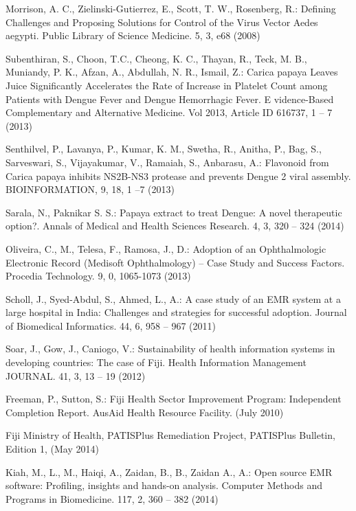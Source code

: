 \documentclass[runningheads,a4paper]{llncs}
\begin{document}
\begin{thebibliography}{4}
 Morrison, A. C., Zielinski-Gutierrez, E., Scott, T. W., Rosenberg, R.: 
Defining Challenges and Proposing Solutions for Control of the Virus Vector Aedes aegypti. 
Public Library of Science Medicine. 5, 3, e68 (2008)

 Subenthiran, S., Choon, T.C., Cheong, K. C., Thayan, R., Teck, M. B., Muniandy, P. K., Afzan, A., Abdullah,  N. R., Ismail, Z.: 
Carica papaya Leaves Juice Significantly Accelerates the Rate of Increase in Platelet Count among Patients with Dengue Fever and Dengue Hemorrhagic Fever. E
vidence-Based Complementary and Alternative Medicine. Vol 2013, Article ID 616737, 1 -- 7 (2013)

 Senthilvel, P., Lavanya, P., Kumar, K. M., Swetha, R., Anitha, P., Bag, S., Sarveswari, S., Vijayakumar, V., Ramaiah, S., Anbarasu, A.: 
Flavonoid from Carica papaya inhibits NS2B-NS3 protease and prevents Dengue 2 viral assembly. 
BIOINFORMATION, 9, 18, 1 --7 (2013)

 Sarala, N., Paknikar S. S.: Papaya extract to treat Dengue: A novel therapeutic option?. 
Annals of Medical and Health Sciences Research. 4, 3, 320 -- 324 (2014)

 Oliveira, C., M., Telesa, F., Ramosa,  J., D.: 
Adoption of an Ophthalmologic Electronic Record (Medisoft Ophthalmology) – Case Study and Success Factors. 
Procedia Technology. 9, 0, 1065-1073 (2013)

 Scholl, J., Syed-Abdul, S., Ahmed, L., A.: 
A case study of an EMR system at a large hospital in India: Challenges and strategies for successful adoption. 
Journal of Biomedical Informatics. 44, 6, 958 -- 967 (2011)

 Soar, J., Gow, J., Caniogo, V.: 
Sustainability of health information systems in developing countries: The case of Fiji. 
Health Information Management JOURNAL. 41, 3, 13 -- 19 (2012)

 Freeman, P., Sutton, S.: 
Fiji Health Sector Improvement Program: Independent Completion Report. AusAid Health Resource Facility. (July 2010)

 Fiji Ministry of Health, PATISPlus Remediation Project, PATISPlus Bulletin, Edition 1, (May 2014)

 Kiah, M., L., M., Haiqi, A., Zaidan, B., B., Zaidan A., A.: 
Open source EMR software: Profiling, insights and hands-on analysis. 
Computer Methods and Programs in Biomedicine. 117, 2, 360 -- 382 (2014)


\end{thebibliography}
\end{document}
